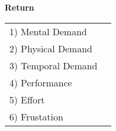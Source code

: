 \textbf{Return}

\begin{table}[!h]
    \centering
    \def\arraystretch{0.5}
    \begin{tabular}{m{} m{}}
        1) Mental Demand & \\
        2) Physical Demand & \\
        3) Temporal Demand & \\
        4) Performance     & \\
        5) Effort        & \\
        6) Frustation     & \\
    \end{tabular}
\end{table}

\pagebreak